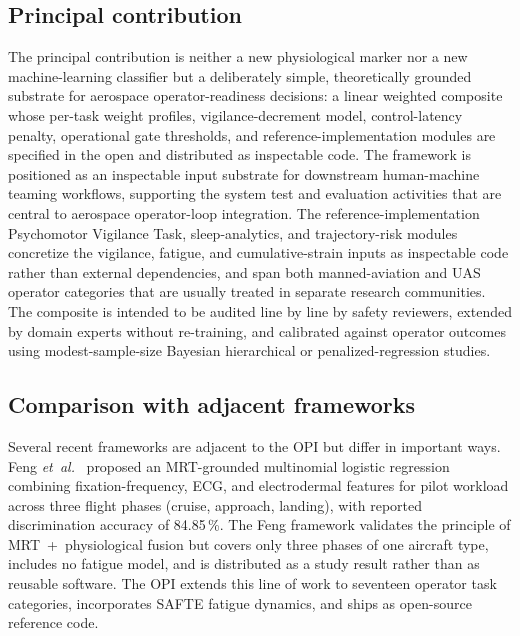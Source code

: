 \documentclass[10pt,journal,twocolumn,compsoc]{IEEEtran}
\begin{document}
\subsection{Principal contribution}
The principal contribution is neither a new physiological marker nor a new machine-learning classifier but a deliberately simple, theoretically grounded substrate for aerospace operator-readiness decisions: a linear weighted composite whose per-task weight profiles, vigilance-decrement model, control-latency penalty, operational gate thresholds, and reference-implementation modules are specified in the open and distributed as inspectable code. The framework is positioned as an inspectable input substrate for downstream human-machine teaming workflows, supporting the system test and evaluation activities that are central to aerospace operator-loop integration. The reference-implementation Psychomotor Vigilance Task, sleep-analytics, and trajectory-risk modules concretize the vigilance, fatigue, and cumulative-strain inputs as inspectable code rather than external dependencies, and span both manned-aviation and UAS operator categories that are usually treated in separate research communities. The composite is intended to be audited line by line by safety reviewers, extended by domain experts without re-training, and calibrated against operator outcomes using modest-sample-size Bayesian hierarchical or penalized-regression studies.

\subsection{Comparison with adjacent frameworks}
Several recent frameworks are adjacent to the OPI but differ in important ways. Feng \textit{et~al.}~\cite{feng2018} proposed an MRT-grounded multinomial logistic regression combining fixation-frequency, ECG, and electrodermal features for pilot workload across three flight phases (cruise, approach, landing), with reported discrimination accuracy of 84.85\,\%. The Feng framework validates the principle of MRT~+~physiological fusion but covers only three phases of one aircraft type, includes no fatigue model, and is distributed as a study result rather than as reusable software. The OPI extends this line of work to seventeen operator task categories, incorporates SAFTE fatigue dynamics, and ships as open-source reference code.
\end{document}
